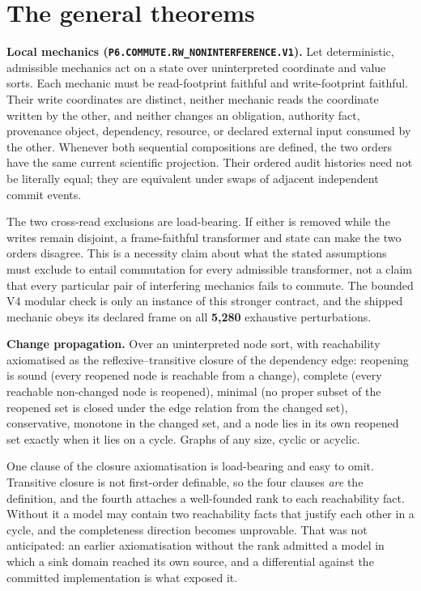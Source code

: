 \section{The general theorems}

\textbf{Local mechanics
(\texttt{P6.COMMUTE.RW\_NONINTERFERENCE.V1}).} Let deterministic,
admissible mechanics act on a state over uninterpreted coordinate and value
sorts. Each mechanic must be read-footprint faithful and write-footprint
faithful. Their write coordinates are distinct, neither mechanic reads the
coordinate written by the other, and neither changes an obligation, authority
fact, provenance object, dependency, resource, or declared external input
consumed by the other. Whenever both sequential compositions are defined, the
two orders have the same current scientific projection. Their ordered audit
histories need not be literally equal; they are equivalent under swaps of
adjacent independent commit events.

The two cross-read exclusions are load-bearing. If either is removed while the
writes remain disjoint, a frame-faithful transformer and state can make the two
orders disagree. This is a necessity claim about what the stated assumptions
must exclude to entail commutation for every admissible transformer, not a claim
that every particular pair of interfering mechanics fails to commute. The
bounded V4 modular check is only an instance of this stronger contract, and the
shipped mechanic obeys its declared frame on all \textbf{5,280} exhaustive
perturbations.

\textbf{Change propagation.} Over an uninterpreted node sort, with reachability
axiomatised as the reflexive--transitive closure of the dependency edge:
reopening is sound (every reopened node is reachable from a change), complete
(every reachable non-changed node is reopened), minimal (no proper subset of the
reopened set is closed under the edge relation from the changed set),
conservative, monotone in the changed set, and a node lies in its own reopened
set exactly when it lies on a cycle. Graphs of any size, cyclic or acyclic.

One clause of the closure axiomatisation is load-bearing and easy to omit.
Transitive closure is not first-order definable, so the four clauses \emph{are} the
definition, and the fourth attaches a well-founded rank to each reachability
fact. Without it a model may contain two reachability facts that justify each
other in a cycle, and the completeness direction becomes unprovable. That was
not anticipated: an earlier axiomatisation without the rank admitted a model in
which a sink domain reached its own source, and a differential against the
committed implementation is what exposed it.

